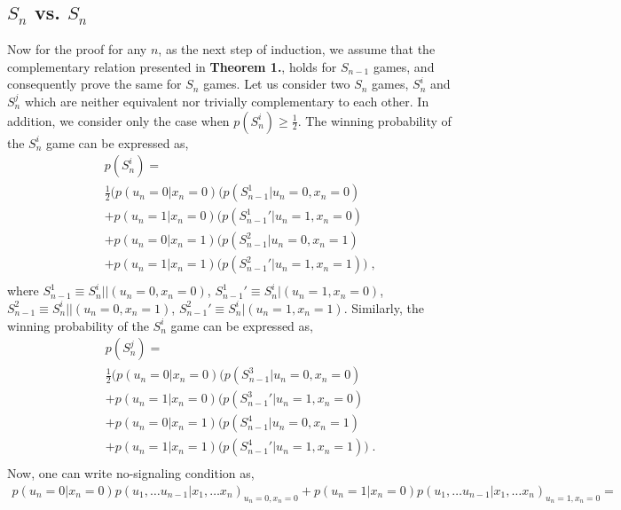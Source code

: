 \begin{widetext}
\begin{appendices}
\subsection*{$S_n$ vs. $S_n$}
Now for the proof for any $n$, as the next step of induction, we assume that the complementary relation presented in \textbf{Theorem 1.}, holds for $S_{n-1}$ games, and consequently prove 
the same for $S_n$ games. Let us consider two $S_n$ games, $S_n^i$ and $S_n^j$ which are neither equivalent nor trivially 
complementary to each other. In addition, we consider only the case when $ p(S_n^i)\geq \frac{1}{2}$. The winning probability of the $S_n^i$ game can be expressed as,
\begin{eqnarray}
\label{S_n__vs__S_n__1}
&&p({S_n^i}) ={}\nonumber\\&& \frac{1}{2} \bigg( p(u_n=0|x_n=0)(p({S_{n-1}^1}|u_n=0,x_n=0){}\nonumber\\&&+p(u_n=1|x_n=0)(p({{S_{n-1}^1}{'}}|u_n=1,x_n=0){}\nonumber\\&&
+p(u_n=0|x_n=1)(p({S_{n-1}^2}|u_n=0,x_n=1){}\nonumber\\&&+p(u_n=1|x_n=1)(p({{S_{n-1}^2}{'}}|u_n=1,x_n=1) \bigg) \; ,
\nonumber\\&&
\end{eqnarray}
where ${S_{n-1}^1} \equiv S_{n}^i||(u_n=0,x_n=0)$,
${{S_{n-1}^1}{'}} \equiv S_{n}^i|(u_n=1,x_n=0)$,${S_{n-1}^2} \equiv S_{n}^i||(u_n=0,x_n=1)$,
${{S_{n-1}^2}{'}} \equiv S_{n}^i|(u_n=1,x_n=1)$.  Similarly, the winning probability of the $S_n^i$ game can be expressed as, 
\begin{eqnarray}
\label{S_n__vs__S_n__2}
&&p({S_n^j}) ={}\nonumber\\&& \frac{1}{2} \bigg( p(u_n=0|x_n=0)(p({S_{n-1}^3}|u_n=0,x_n=0){}\nonumber\\&&+p(u_n=1|x_n=0)(p({S_{n-1}^3}{'}|u_n=1,x_n=0){}\nonumber\\&&
+p(u_n=0|x_n=1)(p({S_{n-1}^4}|u_n=0,x_n=1){}\nonumber\\&&+p(u_n=1|x_n=1)(p({{S_{n-1}^4}{'}}|u_n=1,x_n=1) \bigg) \; . \nonumber\\&& 
\end{eqnarray}
Now, one can write no-signaling condition as,
\begin{equation}
\begin{split}
p(u_n=0|x_n=0)p(u_1,\ldots u_{n-1}|x_1,\ldots x_n)_{u_n=0,x_n=0}+p(u_n=1|x_n=0)p(u_1,\ldots u_{n-1}|x_1,\ldots x_n)_{u_n=1,x_n=0}= \\

\end{split}
\end{equation}
\end{appendices}
\end{widetext}
